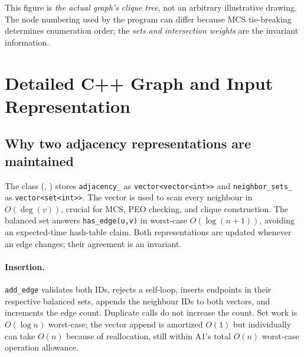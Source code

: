 \begin{center}
\end{center}
This figure is \emph{the actual graph's clique tree}, not an arbitrary illustrative drawing.  The node numbering used by the program can differ because MCS tie-breaking determines enumeration order; the \emph{sets and intersection weights} are the invariant information.

\section{Detailed C++ Graph and Input Representation}
\label{sec:graph-impl}
\subsection{Why two adjacency representations are maintained}
The  class (, ) stores \texttt{adjacency\_} as \texttt{vector<vector<int>>} and \texttt{neighbor\_sets\_} as \texttt{vector<set<int>>}.  The vector is used to scan every neighbour in \(O(\deg(v))\), crucial for MCS, PEO checking, and clique construction.  The balanced set answers \texttt{has\_edge(u,v)} in worst-case \(O(\log(n+1))\), avoiding an expected-time hash-table claim.  Both representations are updated whenever an edge changes; their agreement is an invariant.

\paragraph{Insertion.} \texttt{add\_edge} validates both IDs, rejects a self-loop, inserts endpoints in their respective balanced sets, appends the neighbour IDs to both vectors, and increments the edge count.  Duplicate calls do not increase the count.  Set work is \(O(\log n)\) worst-case; the vector append is amortized \(O(1)\) but individually can take \(O(n)\) because of reallocation, still within A1's total \(O(n)\) worst-case operation allowance.

